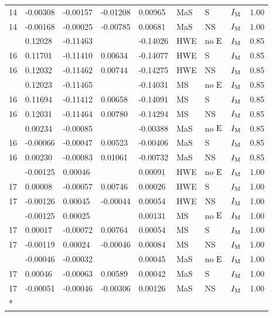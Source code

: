 \begin{longtable}[t]{lllllllll}
14 & -0.00308 & -0.00157 & -0.01208 & 0.00965 & MaS & S & $I_{{\rm M}}$ & 1.00\\
14 & -0.00168 & -0.00025 & -0.00785 & 0.00681 & MaS & NS & $I_{{\rm M}}$ & 1.00\\
\addlinespace
16 & 0.12028 & -0.11463 &  & -0.14026 & HWE & no ${\rm E}$ & $I_{{\rm M}}$ & 0.85\\
16 & 0.11701 & -0.11410 & 0.00634 & -0.14077 & HWE & S & $I_{{\rm M}}$ & 0.85\\
16 & 0.12032 & -0.11462 & 0.00744 & -0.14275 & HWE & NS & $I_{{\rm M}}$ & 0.85\\
\addlinespace
16 & 0.12023 & -0.11465 &  & -0.14031 & MS & no ${\rm E}$ & $I_{{\rm M}}$ & 0.85\\
16 & 0.11694 & -0.11412 & 0.00658 & -0.14091 & MS & S & $I_{{\rm M}}$ & 0.85\\
16 & 0.12031 & -0.11464 & 0.00780 & -0.14294 & MS & NS & $I_{{\rm M}}$ & 0.85\\
\addlinespace
16 & 0.00234 & -0.00085 &  & -0.00388 & MaS & no ${\rm E}$ & $I_{{\rm M}}$ & 0.85\\
16 & -0.00066 & -0.00047 & 0.00523 & -0.00406 & MaS & S & $I_{{\rm M}}$ & 0.85\\
16 & 0.00230 & -0.00083 & 0.01061 & -0.00732 & MaS & NS & $I_{{\rm M}}$ & 0.85\\
\addlinespace
17 & -0.00125 & 0.00046 &  & 0.00091 & HWE & no ${\rm E}$ & $I_{{\rm M}}$ & 1.00\\
17 & 0.00008 & -0.00057 & 0.00746 & 0.00026 & HWE & S & $I_{{\rm M}}$ & 1.00\\
17 & -0.00126 & 0.00045 & -0.00044 & 0.00054 & HWE & NS & $I_{{\rm M}}$ & 1.00\\
\addlinespace
17 & -0.00125 & 0.00025 &  & 0.00131 & MS & no ${\rm E}$ & $I_{{\rm M}}$ & 1.00\\
17 & 0.00017 & -0.00072 & 0.00764 & 0.00054 & MS & S & $I_{{\rm M}}$ & 1.00\\
17 & -0.00119 & 0.00024 & -0.00046 & 0.00084 & MS & NS & $I_{{\rm M}}$ & 1.00\\
\addlinespace
17 & -0.00046 & -0.00032 &  & 0.00045 & MaS & no ${\rm E}$ & $I_{{\rm M}}$ & 1.00\\
17 & 0.00046 & -0.00063 & 0.00589 & 0.00042 & MaS & S & $I_{{\rm M}}$ & 1.00\\
17 & -0.00051 & -0.00046 & -0.00306 & 0.00126 & MaS & NS & $I_{{\rm M}}$ & 1.00\\*
\end{longtable}